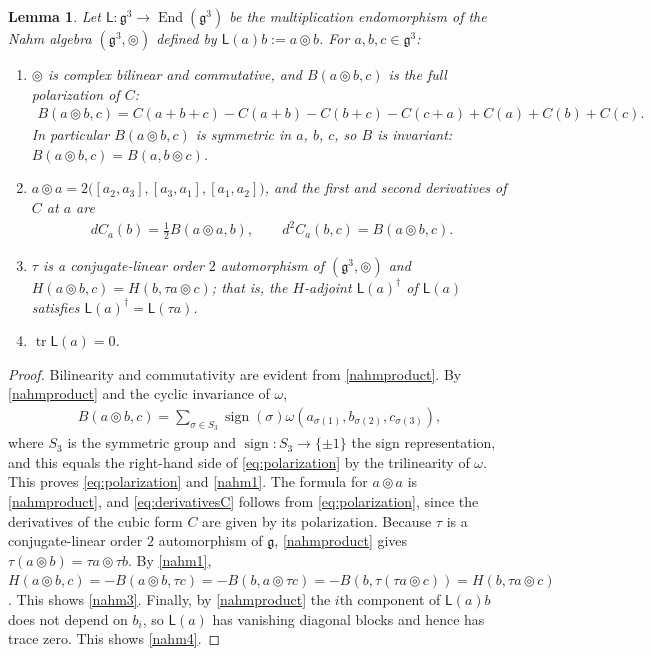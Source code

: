 \documentclass[leqno,10pt]{amsart}
\newtheorem{lemma}[theorem]{Lemma}%
\theoremstyle{definition}
\numberwithin{equation}{section}
\newcommand{\tmlt}{\circledcirc}
\newcommand{\om}{\omega}
\newcommand{\eno}{\operatorname{End}}
\newcommand{\lin}{\mathsf{L}}
\newcommand{\si}{\sigma}
\newcommand{\g}{\mathfrak{g}}
\newcommand{\tr}{\operatorname{tr}}
\newcommand{\sgn}{\operatorname{sign}}
\begin{document}
\begin{lemma}\label{lem:nahmbasic}
Let $\lin:\g^{3} \to \eno(\g^{3})$ be the multiplication endomorphism of the Nahm algebra $(\g^{3}, \tmlt)$ defined by $\lin(a)b := a \tmlt b$. 
For $a, b, c \in \g^{3}$:
\begin{enumerate}[label=(\arabic*), ref=(\arabic*)]
\item\label{nahm1} $\tmlt$ is complex bilinear and commutative, and $B(a \tmlt b, c)$ is the full polarization of $C$:
\begin{align}\label{eq:polarization}
B(a \tmlt b, c) = C(a + b + c) - C(a+b) - C(b+c) - C(c+a) + C(a) + C(b) + C(c).
\end{align}
In particular $B(a \tmlt b, c)$ is symmetric in $a$, $b$, $c$, so $B$ is invariant: $B(a \tmlt b, c) = B(a, b \tmlt c)$.
\item\label{nahm2} $a \tmlt a = 2\big([a_{2}, a_{3}], [a_{3}, a_{1}], [a_{1}, a_{2}]\big)$, and the first and second derivatives of $C$ at $a$ are
\begin{align}\label{eq:derivativesC}
dC_{a}(b) = \tfrac{1}{2}B(a \tmlt a, b), \qquad d^{2}C_{a}(b, c) = B(a \tmlt b, c).
\end{align}
\item\label{nahm3} $\tau$ is a conjugate-linear order $2$ automorphism of $(\g^{3}, \tmlt)$ and $H(a\tmlt b, c) = H(b, \tau a \tmlt c)$; that is, the $H$-adjoint $\lin(a)^{\dagger}$ of $\lin(a)$ satisfies $\lin(a)^{\dagger} = \lin(\tau a)$.
\item\label{nahm4} $\tr \lin(a) = 0$.
\end{enumerate}
\end{lemma}
\begin{proof}
Bilinearity and commutativity are evident from \eqref{nahmproduct}. By \eqref{nahmproduct} and the cyclic invariance of $\om$,
\begin{align}\label{eq:polarizationproof}
B(a \tmlt b, c) = \sum_{\si \in S_{3}}\sgn(\si)\om(a_{\si(1)}, b_{\si(2)}, c_{\si(3)}),
\end{align}
where $S_{3}$ is the symmetric group and $\sgn:S_{3}\to \{\pm 1\}$ the sign representation, and this equals the right-hand side of \eqref{eq:polarization} by the trilinearity of $\om$.
This proves \eqref{eq:polarization} and \ref{nahm1}. The formula for $a \tmlt a$ is \eqref{nahmproduct}, and \eqref{eq:derivativesC} follows from \eqref{eq:polarization}, since the derivatives of the cubic form $C$ are given by its polarization. Because $\tau$ is a conjugate-linear order $2$ automorphism of $\g$, \eqref{nahmproduct} gives $\tau(a \tmlt b) = \tau a \tmlt \tau b$. By \ref{nahm1}, $H(a \tmlt b, c) = -B(a \tmlt b, \tau c) = -B(b, a \tmlt \tau c) = -B(b, \tau(\tau a \tmlt c)) = H(b, \tau a \tmlt c)$. This shows \ref{nahm3}.
Finally, by \eqref{nahmproduct} the $i$th component of $\lin(a)b$ does not depend on $b_{i}$, so $\lin(a)$ has vanishing diagonal blocks and hence has trace zero. This shows \ref{nahm4}.
\end{proof}
\end{document}
